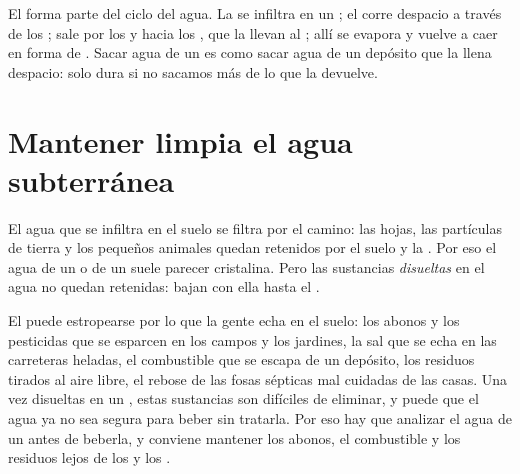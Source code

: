El  forma parte del ciclo del agua. La  se infiltra
en un ; el  corre despacio a través de los ;
sale por los  y hacia los , que la llevan al ; allí
se evapora y vuelve a caer en forma de . Sacar agua de un  es
como sacar agua de un depósito que la  llena despacio: solo dura si
no sacamos más de lo que la  devuelve.

\section{Mantener limpia el agua subterránea}

El agua que se infiltra en el suelo se filtra por el camino: las hojas, las
partículas de tierra y los pequeños animales quedan retenidos por el suelo
y la . Por eso el agua de un  o de un  suele parecer
cristalina. Pero las sustancias \emph{disueltas} en el agua no quedan
retenidas: bajan con ella hasta el .

El  puede estropearse por lo que la gente echa en el suelo:
los abonos y los pesticidas que se esparcen en los campos y los jardines, la
sal que se echa en las carreteras heladas, el combustible que se escapa de
un depósito, los residuos tirados al aire libre, el rebose de las fosas
sépticas mal cuidadas de las casas. Una vez disueltas en un , estas
sustancias son difíciles de eliminar, y puede que el agua ya no sea segura
para beber sin tratarla. Por eso hay que analizar el agua de un  antes de beberla, y conviene mantener los abonos, el combustible y los residuos lejos de los  y los .

